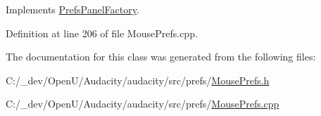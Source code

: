 Implements \hyperlink{class_prefs_panel_factory_a4814184d6050665a43f4929caa73aa0c}{Prefs\+Panel\+Factory}.



Definition at line 206 of file Mouse\+Prefs.\+cpp.



The documentation for this class was generated from the following files\+:\begin{DoxyCompactItemize}
\item 
C\+:/\+\_\+dev/\+Open\+U/\+Audacity/audacity/src/prefs/\hyperlink{_mouse_prefs_8h}{Mouse\+Prefs.\+h}\item 
C\+:/\+\_\+dev/\+Open\+U/\+Audacity/audacity/src/prefs/\hyperlink{_mouse_prefs_8cpp}{Mouse\+Prefs.\+cpp}\end{DoxyCompactItemize}
